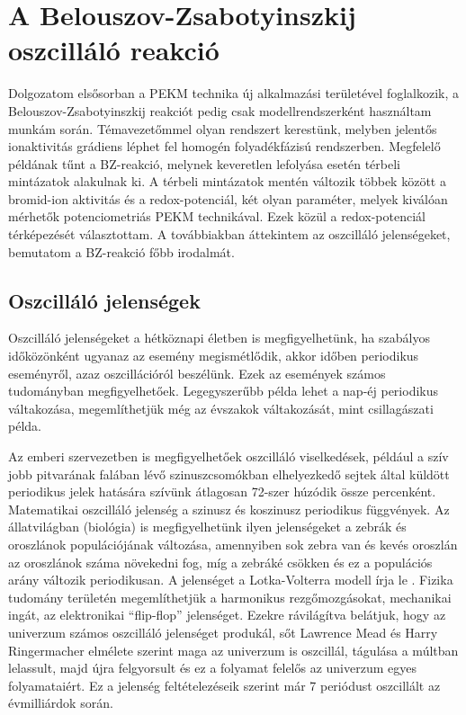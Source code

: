 \section{A Belouszov-Zsabotyinszkij oszcilláló reakció}
Dolgozatom elsősorban a PEKM technika új alkalmazási területével foglalkozik, a Belouszov-Zsabotyinszkij reakciót pedig csak modellrendszerként használtam munkám során. Témavezetőmmel olyan rendszert kerestünk, melyben jelentős ionaktivitás grádiens léphet fel homogén folyadékfázisú rendszerben. Megfelelő példának tűnt a BZ-reakció, melynek keveretlen lefolyása esetén térbeli mintázatok alakulnak ki. A térbeli mintázatok mentén változik többek között a bromid-ion aktivitás és a redox-potenciál, két olyan paraméter, melyek kiválóan mérhetők potenciometriás PEKM technikával. Ezek közül a redox-potenciál térképezését választottam. A továbbiakban áttekintem az oszcilláló jelenségeket, bemutatom a BZ-reakció főbb irodalmát.

\subsection{Oszcilláló jelenségek}
Oszcilláló jelenségeket a hétköznapi életben is megfigyelhetünk, ha szabályos időközönként ugyanaz az esemény megismétlődik, akkor időben periodikus eseményről, azaz oszcillációról beszélünk. Ezek az események számos tudományban megfigyelhetőek. Legegyszerűbb példa lehet a nap-éj periodikus váltakozása, megemlíthetjük még az évszakok váltakozását, mint csillagászati példa.

Az emberi szervezetben is megfigyelhetőek oszcilláló viselkedések, például a szív jobb pitvarának falában lévő szinuszcsomókban elhelyezkedő sejtek által küldött periodikus jelek hatására  szívünk átlagosan 72-szer húzódik össze percenként. Matematikai oszcilláló jelenség a szinusz és koszinusz periodikus függvények. Az állatvilágban (biológia) is megfigyelhetünk ilyen jelenségeket a zebrák és oroszlánok populációjának változása, amennyiben sok zebra van és kevés oroszlán az oroszlánok száma növekedni fog, míg a zebráké csökken és ez a populációs arány változik periodikusan. A jelenséget a Lotka-Volterra modell írja le \cite{lotka1910contribution}. Fizika tudomány területén megemlíthetjük a harmonikus rezgőmozgásokat, mechanikai ingát,  az elektronikai “flip-flop” jelenséget. Ezekre rávilágítva belátjuk, hogy az univerzum számos oszcilláló jelenséget produkál, sőt Lawrence Mead és Harry Ringermacher elmélete \cite{ringermacher2017strong}  szerint maga az univerzum is oszcillál, tágulása a múltban lelassult, majd újra felgyorsult és ez a folyamat felelős az univerzum egyes folyamataiért. Ez a jelenség feltételezéseik szerint már 7 periódust oszcillált az évmilliárdok során.

